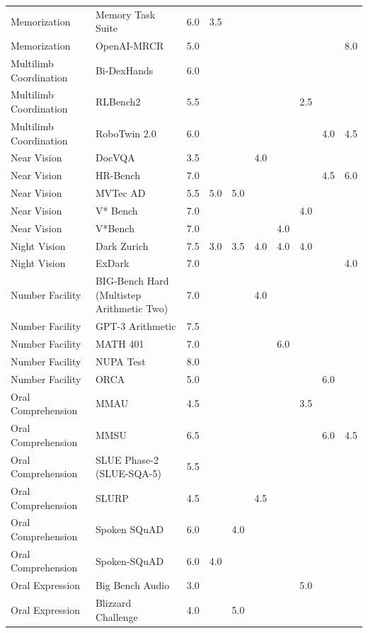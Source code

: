 \begin{longtable}{lp{4.6cm}rrrrrrrr}
Memorization & Memory Task Suite & 6.0 & 3.5 &  &  &  &  &  &  \\
Memorization & OpenAI-MRCR & 5.0 &  &  &  &  &  &  & 8.0 \\
Multilimb Coordination & Bi-DexHands & 6.0 &  &  &  &  &  &  &  \\
Multilimb Coordination & RLBench2 & 5.5 &  &  &  &  & 2.5 &  &  \\
Multilimb Coordination & RoboTwin 2.0 & 6.0 &  &  &  &  &  & 4.0 & 4.5 \\
Near Vision & DocVQA & 3.5 &  &  & 4.0 &  &  &  &  \\
Near Vision & HR-Bench & 7.0 &  &  &  &  &  & 4.5 & 6.0 \\
Near Vision & MVTec AD & 5.5 & 5.0 & 5.0 &  &  &  &  &  \\
Near Vision & V* Bench & 7.0 &  &  &  &  & 4.0 &  &  \\
Near Vision & V*Bench & 7.0 &  &  &  & 4.0 &  &  &  \\
Night Vision & Dark Zurich & 7.5 & 3.0 & 3.5 & 4.0 & 4.0 & 4.0 &  &  \\
Night Vision & ExDark & 7.0 &  &  &  &  &  &  & 4.0 \\
Number Facility & BIG-Bench Hard (Multistep Arithmetic Two) & 7.0 &  &  & 4.0 &  &  &  &  \\
Number Facility & GPT-3 Arithmetic & 7.5 &  &  &  &  &  &  &  \\
Number Facility & MATH 401 & 7.0 &  &  &  & 6.0 &  &  &  \\
Number Facility & NUPA Test & 8.0 &  &  &  &  &  &  &  \\
Number Facility & ORCA & 5.0 &  &  &  &  &  & 6.0 &  \\
Oral Comprehension & MMAU & 4.5 &  &  &  &  & 3.5 &  &  \\
Oral Comprehension & MMSU & 6.5 &  &  &  &  &  & 6.0 & 4.5 \\
Oral Comprehension & SLUE Phase-2 (SLUE-SQA-5) & 5.5 &  &  &  &  &  &  &  \\
Oral Comprehension & SLURP & 4.5 &  &  & 4.5 &  &  &  &  \\
Oral Comprehension & Spoken SQuAD & 6.0 &  & 4.0 &  &  &  &  &  \\
Oral Comprehension & Spoken-SQuAD & 6.0 & 4.0 &  &  &  &  &  &  \\
Oral Expression & Big Bench Audio & 3.0 &  &  &  &  & 5.0 &  &  \\
Oral Expression & Blizzard Challenge & 4.0 &  & 5.0 &  &  &  &  &  \\

\end{longtable}
